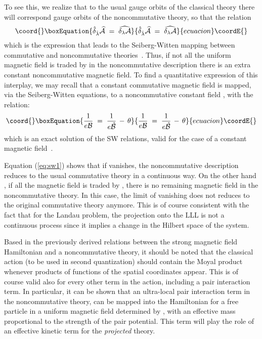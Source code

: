 \documentclass[a4paper,12pt]{article}
\begin{document}
To see this, we realize that to the usual \coordHE{} gauge orbits of
the
classical theory there will correspond gauge orbits of the
noncommutative \coordHE{} theory, so that the relation
\begin{equation}\coord{}\boxEquation{
  \label{eq:sw}
{\hat{\delta}}_{\hat{\lambda}}{\widehat{\mathcal A}} \;=\; 
\widehat{\delta_\lambda {\mathcal A}}
}{
  {\hat{\delta}}_{\hat{\lambda}}{\widehat{\mathcal A}} \;=\; 
\widehat{\delta_\lambda {\mathcal A}}
}{ecuacion}\coordE{}\end{equation}
which is the expression that leads to the Seiberg-Witten mapping
between commutative and noncommutative theories~\cite{SW}.  Thus,
if
not all the uniform magnetic field \coordHE{} is traded by \coordHE{} in
the
noncommutative description there is an extra constant
noncommutative
magnetic field.  To find a quantitative expression of this
interplay,
we may recall that a constant commutative magnetic field is mapped,
via the Seiberg-Witten equations, to a noncommutative constant
field
\coordHE{}, with the relation:
\begin{equation}\coord{}\boxEquation{
  \label{eq:sw1}
\frac{1}{e {\mathcal B}} \;=\; \frac{1}{e {\hat{\mathcal B}}} \,-\,
\theta 
}{
  \frac{1}{e {\mathcal B}} \;=\; \frac{1}{e {\hat{\mathcal B}}} \,-\,
\theta 
}{ecuacion}\coordE{}\end{equation}
which is an exact solution of the SW relations, valid for the case
of
a constant magnetic field~\cite{SW}.

Equation (\ref{eq:sw1}) shows that if \myHighlight{$\theta$}\coordHE{} vanishes, the
noncommutative
description reduces to the usual commutative theory in a continuous
way. On the other hand , if all the magnetic field \coordHE{} is traded by
\coordHE{}, there is no remaining magnetic field in the
noncommutative
theory. In this case, the limit of vanishing \myHighlight{$\theta$}\coordHE{} does not
reduces to
the original commutative theory anymore. This is of course
consistent
with the fact that for the Landau problem, the projection onto the
LLL
is not a continuous process since it implies a change in the
Hilbert
space of the system.
     

Based in the previously derived relations between the strong
magnetic
field Hamiltonian and a noncommutative theory, it should be noted
that
the classical action (to be used in second quantization) should
contain the Moyal product whenever products of functions of the
spatial coordinates appear. This is of course valid also for every
other term in the action, including a pair interaction term.  In
particular, it can be shown that an ultra-local pair interaction
term
in the noncommutative theory, can be mapped into the Hamiltonian
for a
free particle in a uniform magnetic field determined by \myHighlight{$\theta$}\coordHE{},
with an
effective mass proportional to the strength of the pair potential.
This term will play the role of an effective kinetic term for the
{\it
  projected\/} theory.
\end{document}
